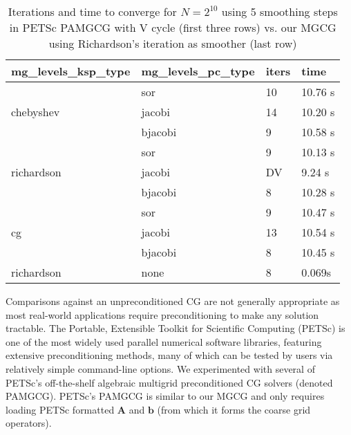 \begin{table}
\caption{Iterations and time to converge for $N=2^{10}$ using 5 smoothing steps in PETSc PAMGCG with V cycle (first three rows) vs. our MGCG using Richardson's iteration as smoother (last row)}
\begin{center}
\small\sf\centering
\begin{tabular}{llll}
\toprule
mg\_levels\_ksp\_type & mg\_levels\_pc\_type & iters & time \\
\midrule
\multirow{3}{*}{chebyshev}  & sor     & 10 & 10.76 s \\ 
                            & jacobi  & 14 & 10.20 s \\ 
                            & bjacobi & 9 & 10.58 s \\ \midrule
\multirow{3}{*}{richardson} & sor     & 9 & 10.13 s \\ 
                            & jacobi  & DV & 9.24 s \\  
                            & bjacobi & 8 & 10.28 s \\ \midrule
\multirow{3}{*}{cg}         & sor     & 9 & 10.47 s \\ 
                            & jacobi  & 13 & 10.54 s \\ 
                            & bjacobi & 8 & 10.45 s \\ \midrule
 richardson & none & 8 & 0.069s\\
\bottomrule
\end{tabular}
\end{center}
\label{table:petsc_5}
\end{table}




Comparisons against an unpreconditioned CG are not generally appropriate as most real-world applications require preconditioning to make any solution tractable. The Portable, Extensible Toolkit for Scientific Computing (PETSc) \cite{petsc-web-page} is one of the most widely used parallel numerical software libraries, featuring extensive preconditioning methods, many of which can be tested by users via relatively simple command-line options.  We experimented with several of PETSc's off-the-shelf algebraic multigrid preconditioned CG solvers (denoted PAMGCG). PETSc's PAMGCG is similar to our MGCG and only requires loading PETSc formatted $\mathbf{A}$ and $\mathbf{b}$ (from which it forms the coarse grid operators). 



